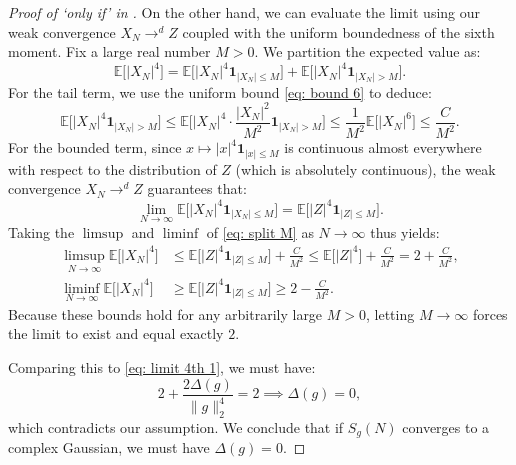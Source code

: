 \documentclass[12pt]{amsart}
\renewcommand{\le}{\leqslant}
\renewcommand{\ge}{\geqslant}
\numberwithin{equation}{section}
\theoremstyle{plain}
\theoremstyle{definition}
\newcommand{\E}{\mathbb{E}}
\begin{document}
\begin{proof}[Proof of `only if' in ]
		On the other hand, we can evaluate the limit using our weak convergence $X_N \to^d Z$ coupled with the uniform boundedness of the sixth moment. Fix a large real number $M > 0$. We partition the expected value as:
		\begin{equation}\label{eq: split M}
			\E\big[|X_N|^4\big] = \E\big[|X_N|^4 \bm{1}_{|X_N| \le M}\big] + \E\big[|X_N|^4 \bm{1}_{|X_N| > M}\big].
		\end{equation}
		For the tail term, we use the uniform bound \eqref{eq: bound 6} to deduce:
		\begin{equation*}
			\E\big[|X_N|^4 \bm{1}_{|X_N| > M}\big] \le \E\bigg[|X_N|^4 \cdot \frac{|X_N|^2}{M^2} \bm{1}_{|X_N| > M}\bigg] \le \frac{1}{M^2}\E\big[|X_N|^6\big] \le \frac{C}{M^2}.
		\end{equation*}
		For the bounded term, since $x \mapsto |x|^4 \bm{1}_{|x| \le M}$ is continuous almost everywhere with respect to the distribution of $Z$ (which is absolutely continuous), the weak convergence $X_N \to^d Z$ guarantees that:
		\begin{equation*}
			\lim_{N \to \infty} \E\big[|X_N|^4 \bm{1}_{|X_N| \le M}\big] = \E\big[|Z|^4 \bm{1}_{|Z| \le M}\big].
		\end{equation*}
		Taking the $\limsup$ and $\liminf$ of \eqref{eq: split M} as $N \to \infty$ thus yields:
		\begin{align*}
			\limsup_{N \to \infty} \E\big[|X_N|^4\big] &\le \E\big[|Z|^4 \bm{1}_{|Z| \le M}\big] + \frac{C}{M^2} \le \E\big[|Z|^4\big] + \frac{C}{M^2} = 2 + \frac{C}{M^2}, \\
			\liminf_{N \to \infty} \E\big[|X_N|^4\big] &\ge \E\big[|Z|^4 \bm{1}_{|Z| \le M}\big] \ge 2 - \frac{C}{M^2}.
		\end{align*}
		Because these bounds hold for any arbitrarily large $M > 0$, letting $M \to \infty$ forces the limit to exist and equal exactly $2$. 
		
		Comparing this to \eqref{eq: limit 4th 1}, we must have:
		$$2 + \frac{2 \Delta(g)}{\|g\|_2^4} = 2 \implies \Delta(g) = 0,$$
		which contradicts our assumption. We conclude that if $S_g(N)$ converges to a complex Gaussian, we must have $\Delta(g) = 0$.
	\end{proof}
	
	
	
\end{document}
